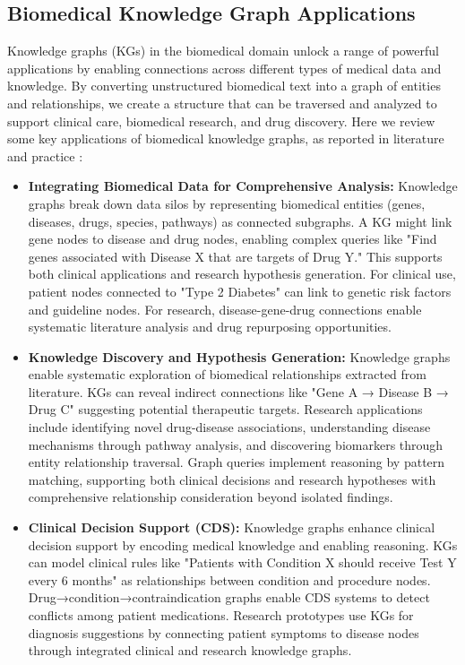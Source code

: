 \subsection{Biomedical Knowledge Graph Applications}

Knowledge graphs (KGs) in the biomedical domain unlock a range of powerful applications by enabling connections across different types of medical data and knowledge. By converting unstructured biomedical text into a graph of entities and relationships, we create a structure that can be traversed and analyzed to support clinical care, biomedical research, and drug discovery. Here we review some key applications of biomedical knowledge graphs, as reported in literature and practice \parencite{Milvus2025}:

\begin{itemize}
\item \textbf{Integrating Biomedical Data for Comprehensive Analysis:} Knowledge graphs break down data silos by representing biomedical entities (genes, diseases, drugs, species, pathways) as connected subgraphs. A KG might link gene nodes to disease and drug nodes, enabling complex queries like "Find genes associated with Disease X that are targets of Drug Y." This supports both clinical applications and research hypothesis generation. For clinical use, patient nodes connected to "Type 2 Diabetes" can link to genetic risk factors and guideline nodes. For research, disease-gene-drug connections enable systematic literature analysis and drug repurposing opportunities.

\item \textbf{Knowledge Discovery and Hypothesis Generation:} Knowledge graphs enable systematic exploration of biomedical relationships extracted from literature. KGs can reveal indirect connections like "Gene A → Disease B → Drug C" suggesting potential therapeutic targets. Research applications include identifying novel drug-disease associations, understanding disease mechanisms through pathway analysis, and discovering biomarkers through entity relationship traversal. Graph queries implement reasoning by pattern matching, supporting both clinical decisions and research hypotheses with comprehensive relationship consideration beyond isolated findings.

\item \textbf{Clinical Decision Support (CDS):} Knowledge graphs enhance clinical decision support by encoding medical knowledge and enabling reasoning. KGs can model clinical rules like "Patients with Condition X should receive Test Y every 6 months" as relationships between condition and procedure nodes. Drug→condition→contraindication graphs enable CDS systems to detect conflicts among patient medications. Research prototypes use KGs for diagnosis suggestions by connecting patient symptoms to disease nodes through integrated clinical and research knowledge graphs.
\end{itemize}

